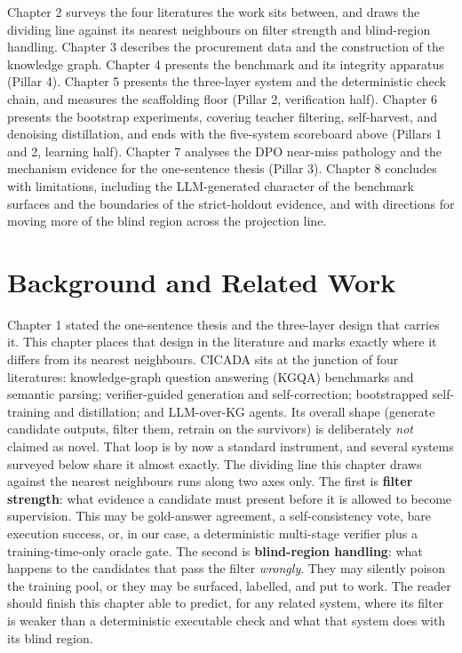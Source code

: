 \documentclass[10pt]{article} %
\begin{document}
Chapter 2 surveys the four literatures the work sits between, and draws the dividing line against its nearest neighbours on filter strength and blind-region handling. Chapter 3 describes the procurement data and the construction of the knowledge graph. Chapter 4 presents the benchmark and its integrity apparatus (Pillar 4). Chapter 5 presents the three-layer system and the deterministic check chain, and measures the scaffolding floor (Pillar 2, verification half). Chapter 6 presents the bootstrap experiments, covering teacher filtering, self-harvest, and denoising distillation, and ends with the five-system scoreboard above (Pillars 1 and 2, learning half). Chapter 7 analyses the DPO near-miss pathology and the mechanism evidence for the one-sentence thesis (Pillar 3). Chapter 8 concludes with limitations, including the LLM-generated character of the benchmark surfaces and the boundaries of the strict-holdout evidence, and with directions for moving more of the blind region across the projection line.

\section{Background and Related Work}\label{sec:chapter-2-background-and-related-work}

Chapter 1 stated the one-sentence thesis and the three-layer design that carries it. This chapter places that design in the literature and marks exactly where it differs from its nearest neighbours. CICADA sits at the junction of four literatures: knowledge-graph question answering (KGQA) benchmarks and semantic parsing; verifier-guided generation and self-correction; bootstrapped self-training and distillation; and LLM-over-KG agents. Its overall shape (generate candidate outputs, filter them, retrain on the survivors) is deliberately \emph{not} claimed as novel. That loop is by now a standard instrument, and several systems surveyed below share it almost exactly. The dividing line this chapter draws against the nearest neighbours runs along two axes only. The first is \textbf{filter strength}: what evidence a candidate must present before it is allowed to become supervision. This may be gold-answer agreement, a self-consistency vote, bare execution success, or, in our case, a deterministic multi-stage verifier plus a training-time-only oracle gate. The second is \textbf{blind-region handling}: what happens to the candidates that pass the filter \emph{wrongly}. They may silently poison the training pool, or they may be surfaced, labelled, and put to work. The reader should finish this chapter able to predict, for any related system, where its filter is weaker than a deterministic executable check and what that system does with its blind region.
\end{document}
